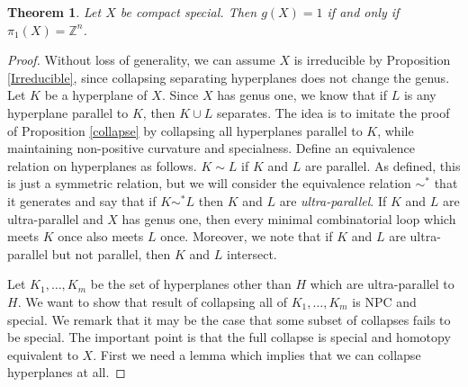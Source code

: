 \documentclass[11pt]{amsart}
\newtheorem{thm}{Theorem}
\numberwithin{thm}{section}
\theoremstyle{remark}
\theoremstyle{definition}
\newcommand{\Z}{\mathbb{Z}}
\begin{document}
\begin{thm}\label{genus1}Let $X$ be compact special.  Then $g(X)=1$ if and only if $\pi_1(X)=\Z^n$.
\end{thm}
\begin{proof}

Without loss of generality, we can assume $X$ is irreducible by Proposition \ref{Irreducible}, since collapsing separating hyperplanes does not change the genus.  Let $K$ be a hyperplane of $X$.  Since $X$ has genus one, we know that if $L$ is any hyperplane parallel to $K$, then $K\cup L$ separates. The idea is to imitate the proof of Proposition \ref{collapse} by collapsing all hyperplanes parallel to $K$, while maintaining non-positive curvature and specialness. Define an equivalence relation on hyperplanes as follows.  $K\sim L$ if $K$ and $L$ are parallel. As defined, this is just a symmetric relation, but we will consider the equivalence relation $\sim^*$ that it generates and say that if $K\sim^* L$ then $K$ and $L$ are \emph{ultra-parallel}.  If $K$ and $L$ are ultra-parallel and $X$ has genus one, then every minimal combinatorial loop which meets $K$ once also meets $L$ once.  Moreover, we note that if $K$ and $L$ are ultra-parallel but not parallel, then $K$ and $L$ intersect.  

Let $K_1,\ldots, K_m$ be the set of hyperplanes other than $H$ which are ultra-parallel to $H$. We want to show that result of collapsing all of $K_1,\ldots, K_m$ is NPC and special.  We remark that it may be the case that some subset of collapses fails to be special. The important point is that the full collapse is special and homotopy equivalent to $X$.  First we need a lemma which implies that we can collapse hyperplanes at all.


\end{proof}
\end{document}
